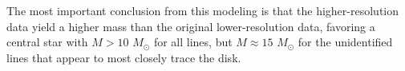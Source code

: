 \documentclass[twocolumn]{aastex61}
\newcommand{\msun}{\ensuremath{M_{\odot}}\xspace}			%
\begin{document}
The most important conclusion from this modeling is that the higher-resolution
data yield a higher mass than the original lower-resolution data, favoring a
central star with $M>10$ \msun for all lines, but $M\approx15$ \msun for the
unidentified lines that appear to most closely trace the disk. 
\end{document}
